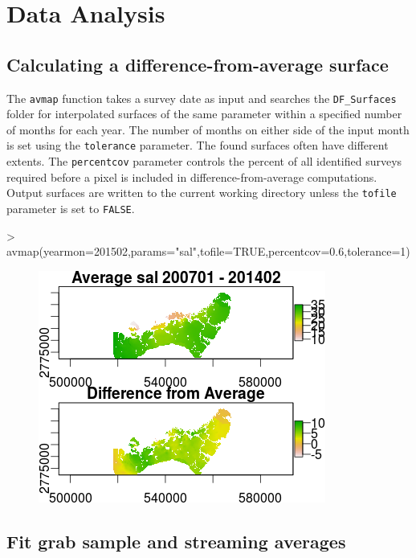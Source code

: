 \documentclass[12pt]{article}
\begin{document}
\section{Data Analysis}
\subsection{Calculating a difference-from-average surface}
The \texttt{avmap} function takes a survey date as input and searches the \verb|DF_Surfaces| folder for interpolated surfaces of the same parameter within a specified number of months for each year. The number of months on either side of the input month is set using the \texttt{tolerance} parameter. The found surfaces often have different extents. The \texttt{percentcov} parameter controls the percent of all identified surveys required before a pixel is included in difference-from-average computations. Output surfaces are written to the current working directory unless the \texttt{tofile} parameter is set to \texttt{FALSE}.

\begin{Schunk}
\begin{Sinput}
> avmap(yearmon=201502,params="sal",tofile=TRUE,percentcov=0.6,tolerance=1)
\end{Sinput}
\end{Schunk}

\begin{figure}[H]
\begin{center}
\includegraphics{figure2}
\end{center}
\label{fig:two}
\end{figure}

\subsection{Fit grab sample and streaming averages}
\end{document}
